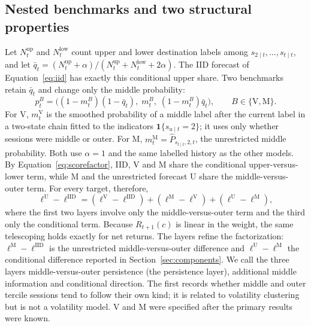 \subsection{Nested benchmarks and two structural properties}\label{sec:benchmarks}
Let $N^{\mathrm{up}}_t$ and $N^{\mathrm{low}}_t$ count upper and lower destination labels among $s_{2\mid t},\ldots,s_{t\mid t}$, and let $\bar q_t=(N^{\mathrm{up}}_t+\alpha)/(N^{\mathrm{up}}_t+N^{\mathrm{low}}_t+2\alpha)$. The IID forecast of Equation~\eqref{eq:iid} has exactly this conditional upper share. Two benchmarks retain $\bar q_t$ and change only the middle probability:
\begin{equation}
p^{B}_t=\bigl((1-m^{B}_t)(1-\bar q_t),\;m^{B}_t,\;(1-m^{B}_t)\bar q_t\bigr),\qquad B\in\{\mathrm V,\mathrm M\}.
\label{eq:benchmarks}
\end{equation}
For V, $m^{\mathrm V}_t$ is the smoothed probability of a middle label after the current label in a two-state chain fitted to the indicators $\mathbf 1\{s_{u\mid t}=2\}$; it uses only whether sessions were middle or outer. For M, $m^{\mathrm M}_t=\widehat P_{s_{t\mid t},2,t}$, the unrestricted middle probability. Both use $\alpha=1$ and the same labelled history as the other models. By Equation~\eqref{eq:scorefactor}, IID, V and M share the conditional upper-versus-lower term, while M and the unrestricted forecast U share the middle-versus-outer term. For every target, therefore,
\begin{equation}
\ell^{\mathrm U}-\ell^{\mathrm{IID}}=(\ell^{\mathrm V}-\ell^{\mathrm{IID}})+(\ell^{\mathrm M}-\ell^{\mathrm V})+(\ell^{\mathrm U}-\ell^{\mathrm M}),
\label{eq:layers}
\end{equation}
where the first two layers involve only the middle-versus-outer term and the third only the conditional term. Because $R_{t+1}(c)$ is linear in the weight, the same telescoping holds exactly for net returns. The layers refine the factorization: $\ell^{\mathrm M}-\ell^{\mathrm{IID}}$ is the unrestricted middle-versus-outer difference and $\ell^{\mathrm U}-\ell^{\mathrm M}$ the conditional difference reported in Section~\ref{sec:components}. We call the three layers middle-versus-outer persistence (the persistence layer), additional middle information and conditional direction. The first records whether middle and outer tercile sessions tend to follow their own kind; it is related to volatility clustering but is not a volatility model. V and M were specified after the primary results were known.


